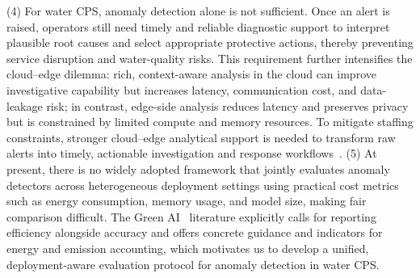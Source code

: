 \documentclass[pdflatex,sn-mathphys-num]{sn-jnl}%
\theoremstyle{thmstyleone}
\theoremstyle{thmstyletwo}%
\theoremstyle{thmstylethree}%
\begin{document}
(4) For water CPS, anomaly detection alone is not sufficient. Once an alert is raised, operators still need timely and reliable diagnostic support to interpret plausible root causes and select appropriate protective actions, thereby preventing service disruption and water-quality risks. This requirement further intensifies the cloud--edge dilemma: rich, context-aware analysis in the cloud can improve investigative capability but increases latency, communication cost, and data-leakage risk; in contrast, edge-side analysis reduces latency and preserves privacy but is constrained by limited compute and memory resources. To mitigate staffing constraints, stronger cloud--edge analytical support is needed to transform raw alerts into timely, actionable investigation and response workflows~\cite{amin2013water_scada,cook2022anomaly_diagnosis}.
(5) At present, there is no widely adopted framework that jointly evaluates anomaly detectors across heterogeneous deployment settings using practical cost metrics such as energy consumption, memory usage, and model size, making fair comparison difficult. The Green AI~\cite{efficiency_framework} literature explicitly calls for reporting efficiency alongside accuracy and offers concrete guidance and indicators for energy and emission accounting, which motivates us to develop a unified, deployment-aware evaluation protocol for anomaly detection in water CPS.
\end{document}
